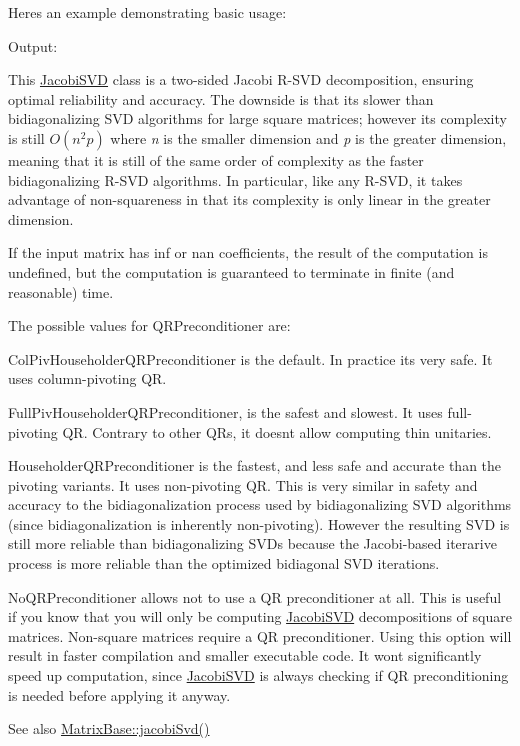Here\textquotesingle{}s an example demonstrating basic usage\+: 
\begin{DoxyCodeInclude}{0}
\end{DoxyCodeInclude}
 Output\+: 
\begin{DoxyVerbInclude}
\end{DoxyVerbInclude}


This \mbox{\hyperlink{class_eigen_1_1_jacobi_s_v_d}{Jacobi\+S\+VD}} class is a two-\/sided Jacobi R-\/\+S\+VD decomposition, ensuring optimal reliability and accuracy. The downside is that it\textquotesingle{}s slower than bidiagonalizing S\+VD algorithms for large square matrices; however its complexity is still $ O(n^2p) $ where {\itshape n} is the smaller dimension and {\itshape p} is the greater dimension, meaning that it is still of the same order of complexity as the faster bidiagonalizing R-\/\+S\+VD algorithms. In particular, like any R-\/\+S\+VD, it takes advantage of non-\/squareness in that its complexity is only linear in the greater dimension.

If the input matrix has inf or nan coefficients, the result of the computation is undefined, but the computation is guaranteed to terminate in finite (and reasonable) time.

The possible values for Q\+R\+Preconditioner are\+: \begin{DoxyItemize}
\item Col\+Piv\+Householder\+Q\+R\+Preconditioner is the default. In practice it\textquotesingle{}s very safe. It uses column-\/pivoting QR. \item Full\+Piv\+Householder\+Q\+R\+Preconditioner, is the safest and slowest. It uses full-\/pivoting QR. Contrary to other Q\+Rs, it doesn\textquotesingle{}t allow computing thin unitaries. \item Householder\+Q\+R\+Preconditioner is the fastest, and less safe and accurate than the pivoting variants. It uses non-\/pivoting QR. This is very similar in safety and accuracy to the bidiagonalization process used by bidiagonalizing S\+VD algorithms (since bidiagonalization is inherently non-\/pivoting). However the resulting S\+VD is still more reliable than bidiagonalizing S\+V\+Ds because the Jacobi-\/based iterarive process is more reliable than the optimized bidiagonal S\+VD iterations. \item No\+Q\+R\+Preconditioner allows not to use a QR preconditioner at all. This is useful if you know that you will only be computing \mbox{\hyperlink{class_eigen_1_1_jacobi_s_v_d}{Jacobi\+S\+VD}} decompositions of square matrices. Non-\/square matrices require a QR preconditioner. Using this option will result in faster compilation and smaller executable code. It won\textquotesingle{}t significantly speed up computation, since \mbox{\hyperlink{class_eigen_1_1_jacobi_s_v_d}{Jacobi\+S\+VD}} is always checking if QR preconditioning is needed before applying it anyway.\end{DoxyItemize}
\begin{DoxySeeAlso}{See also}
\mbox{\hyperlink{class_eigen_1_1_matrix_base_a5745dca9c54390633b434e54a1d1eedd}{Matrix\+Base\+::jacobi\+Svd()}} 
\end{DoxySeeAlso}



